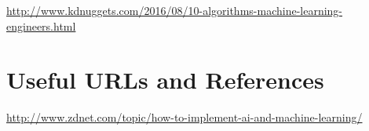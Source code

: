 \documentclass[11pt]{article}
\begin{document}
\smallskip \smallskip
\noindent
\href{http://www.kdnuggets.com/2016/08/10-algorithms-machine-learning-engineers.html}{http://www.kdnuggets.com/2016/08/10-algorithms-machine-learning-engineers.html}


\section{Useful URLs and References}
\href{http://www.zdnet.com/topic/how-to-implement-ai-and-machine-learning/}{http://www.zdnet.com/topic/how-to-implement-ai-and-machine-learning/}\\

















\end{document}
